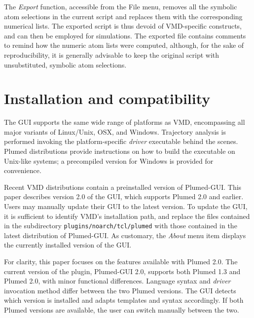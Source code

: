 \documentclass[preprint,review,11pt]{elsarticle}
\begin{document}
The \emph{Export} function, accessible from the File menu, removes all
the symbolic atom selections in the current script and replaces them
with the corresponding numerical lists. The exported script is thus
devoid of VMD-specific constructs, and can then be employed for
simulations.  The exported file contains comments to remind how the
numeric atom lists were computed, although, for the sake of
reproducibility, it is generally advisable to keep the original
script with unsubstituted, symbolic atom selections.



\section{Installation and compatibility}

The GUI supports the same wide range of platforms as VMD, encompassing
all major variants of Linux/Unix, OSX, and Windows.  Trajectory
analysis is performed invoking the platform-specific \emph{driver}
executable behind the scenes. Plumed distributions provide
instructions on how to build the executable on Unix-like systems; a
precompiled version for Windows is provided for convenience.

Recent VMD distributions contain a preinstalled version of Plumed-GUI.
This paper describes version 2.0 of the GUI, which supports Plumed 2.0
and earlier.  Users may manually update their GUI to the latest
version.  To update the GUI, it is sufficient to identify VMD's
installation path, and replace the files contained in the subdirectory
\texttt{plugins/noarch/tcl/plumed} with those contained in the latest
distribution of Plumed-GUI.  As customary, the \emph{About} menu item
displays the currently installed version of the GUI.

For clarity, this paper focuses on the features available with Plumed
2.0. The current version of the plugin, Plumed-GUI 2.0, supports both
Plumed 1.3 and Plumed 2.0, with minor functional differences.
Language syntax and \emph{driver} invocation method differ between the
two Plumed versions.  The GUI detects which version is installed and
adapts templates and syntax accordingly.  If both Plumed versions are
available, the user can switch manually between the two.






\end{document}
